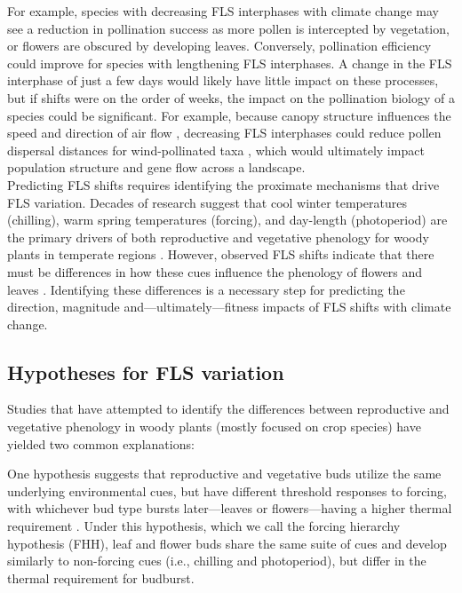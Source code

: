 \documentclass[11pt]{article}\usepackage[]{graphicx}\usepackage[]{color}
\begin{document}
\noindent For example, species with decreasing FLS interphases with climate change may see a reduction in pollination success as more pollen is intercepted by vegetation, or flowers are obscured by developing leaves. Conversely, pollination efficiency could improve for species with lengthening FLS interphases. A change in the FLS interphase of just a few days would likely have little impact on these processes, but if shifts were on the order of weeks, the impact on the pollination biology of a species could be significant. For example, because canopy structure influences the speed and direction of air flow \citep{Niklas1985, Jackson:1999aa}, decreasing FLS interphases could reduce pollen dispersal distances for wind-pollinated taxa \citep{Milleron2012}, which would ultimately impact population structure and gene flow across a landscape.\\

\noindent Predicting FLS shifts requires identifying the proximate mechanisms that drive FLS variation. Decades of research suggest that cool winter temperatures (chilling), warm spring temperatures (forcing), and day-length (photoperiod) are the primary drivers of both reproductive and vegetative phenology  for woody plants in temperate regions \citep{Korner:2010aa,Flynn2018}. However, observed FLS shifts indicate that there must be differences in how these cues influence the phenology of flowers and leaves \citep{Buonaiuto2020}. Identifying these differences is a necessary step for predicting the direction, magnitude and---ultimately---fitness impacts of FLS shifts with climate change.

\subsection*{Hypotheses for FLS variation}

\noindent Studies that have attempted to identify the differences between reproductive and vegetative phenology in woody plants (mostly focused on crop species) have yielded two common explanations:

\noindent One hypothesis suggests that reproductive and vegetative buds utilize the same underlying environmental cues, but have different threshold responses to forcing, with whichever bud type bursts later---leaves or flowers---having a higher thermal requirement \citep[that is, they need a great sum of warm temperature to trigger the phenological event,][]{Guo2014,COSMULESCU:2020aa,Cosmulescu:2018aa}. Under this hypothesis, which we call the forcing hierarchy hypothesis (FHH), leaf and flower buds share the same suite of cues and develop similarly to non-forcing cues (i.e., chilling and photoperiod), but differ in the thermal requirement for budburst.\\
\end{document}
